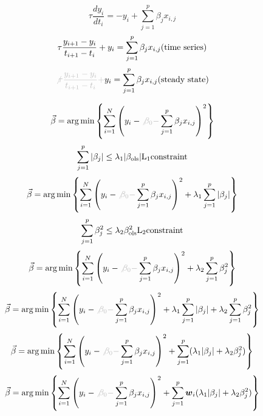 \documentclass{article}
\newcommand{\tmmathbf}[1]{\ensuremath{\boldsymbol{#1}}}
\newcommand{\tmop}[1]{\ensuremath{\operatorname{#1}}}
\begin{document}
\ \
\[ \tau \frac{d y_i}{d t_i} = - y_i + \sum^p_{j = 1} \beta_j x_{i, j} \]
\[ \tau \frac{y_{i + 1} - y_i}{t_{i + 1} - t_i} + y_i = \sum^p_{j = 1} \beta_j
   x_{i, j} \text{(\tmop{time} \tmop{series})} \]
\[ {\color{grey} \not{\tau \frac{y_{i + 1} - y_i}{t_{i + 1} - t_i}} +} y_i =
   \sum^p_{j = 1} \beta_j x_{i, j} \text{(\tmop{steady} \tmop{state})} \]



\[ \vec{\beta} = \arg \min \left\{ \sum^N_{i = 1} \left( y_i - {\color{grey}
   \not{\beta_0 -}} \sum^p_{j = 1} \beta_j x_{i, j} \right)^2 \right\} \]
\[ \sum_{j = 1}^p | \beta_j | \leq \lambda_1 | \beta_{\tmop{ols}} | \text{L}_1
   \text{\tmop{constraint}} \]
\[ \vec{\beta} = \arg \min \left\{ \sum^N_{i = 1} \left( y_i - {\color{grey}
   \not{\beta_0 -}} \sum^p_{j = 1} \beta_j x_{i, j} \right)^2 + \lambda_1
   \sum_{j = 1}^p | \beta_j | \right\} \]
\[ \sum_{j = 1}^p \beta^2_j \leq \lambda_2 \beta^2_{\tmop{ols}} \text{L}_2
   \text{\tmop{constraint}} \]
\[ \vec{\beta} = \arg \min \left\{ \sum^N_{i = 1} \left( y_i - {\color{grey}
   \not{\beta_0 -}} \sum^p_{j = 1} \beta_j x_{i, j} \right)^2 + \lambda_2
   \sum_{j = 1}^p \beta^2_j \right\} \]
\[ \vec{\beta} = \arg \min \left\{ \sum^N_{i = 1} \left( y_i - {\color{grey}
   \not{\beta_0 -}} \sum^p_{j = 1} \beta_j x_{i, j} \right)^2 + \lambda_1
   \sum_{j = 1}^p | \beta_j | + \lambda_2 \sum_{j = 1}^p \beta^2_j \right\} \]
\[ \vec{\beta} = \arg \min \left\{ \sum^N_{i = 1} \left( y_i - {\color{grey}
   \not{\beta_0 -}} \sum^p_{j = 1} \beta_j x_{i, j} \right)^2 + \sum_{j = 1}^p
   ( \lambda_1 | \beta_j | + \lambda_2 \beta^2_j) \right\} \]
\[ \vec{\beta} = \arg \min \left\{ \sum^N_{i = 1} \left( y_i - {\color{grey}
   \not{\beta_0 -}} \sum^p_{j = 1} \beta_j x_{i, j} \right)^2 + \sum_{j = 1}^p
   \tmmathbf{w}_i ( \lambda_1 | \beta_j | + \lambda_2 \beta^2_j) \right\} \]
\end{document}
